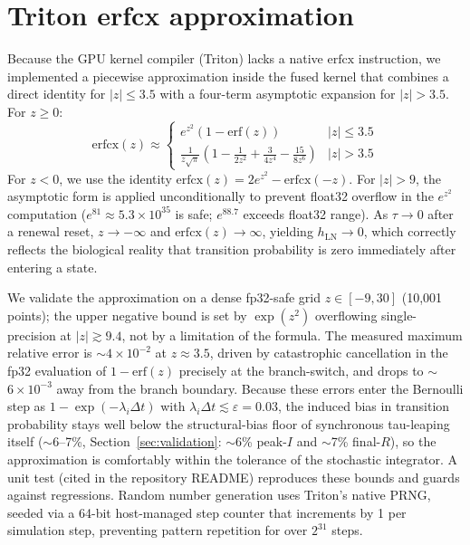 \appendix

\section{Triton erfcx approximation}\label{app:erfcx}

Because the GPU kernel compiler (Triton) lacks a native $\mathrm{erfcx}$ instruction, we implemented a piecewise approximation inside the fused kernel that combines a direct identity for $|z| \leq 3.5$ with a four-term asymptotic expansion for $|z| > 3.5$. For $z \geq 0$:
\begin{equation}
    \mathrm{erfcx}(z) \approx \begin{cases}
        e^{z^2}(1 - \mathrm{erf}(z)) & |z| \leq 3.5 \\[4pt]
        \displaystyle\frac{1}{z\sqrt{\pi}}\left(1 - \frac{1}{2z^2} + \frac{3}{4z^4} - \frac{15}{8z^6}\right) & |z| > 3.5
    \end{cases}
\end{equation}
For $z < 0$, we use the identity $\mathrm{erfcx}(z) = 2e^{z^2} - \mathrm{erfcx}(-z)$. For $|z| > 9$, the asymptotic form is applied unconditionally to prevent float32 overflow in the $e^{z^2}$ computation ($e^{81} \approx 5.3 \times 10^{35}$ is safe; $e^{88.7}$ exceeds float32 range). As $\tau \to 0$ after a renewal reset, $z \to -\infty$ and $\mathrm{erfcx}(z) \to \infty$, yielding $h_{\mathrm{LN}} \to 0$, which correctly reflects the biological reality that transition probability is zero immediately after entering a state.

We validate the approximation on a dense fp32-safe grid $z \in [-9, 30]$ (10{,}001 points); the upper negative bound is set by $\exp(z^2)$ overflowing single-precision at $|z| \gtrsim 9.4$, not by a limitation of the formula. The measured maximum relative error is $\sim$$4 \times 10^{-2}$ at $z \approx 3.5$, driven by catastrophic cancellation in the fp32 evaluation of $1 - \mathrm{erf}(z)$ precisely at the branch-switch, and drops to $\sim$$6 \times 10^{-3}$ away from the branch boundary. Because these errors enter the Bernoulli step as $1 - \exp(-\lambda_i \Delta t)$ with $\lambda_i \Delta t \lesssim \varepsilon = 0.03$, the induced bias in transition probability stays well below the structural-bias floor of synchronous tau-leaping itself ($\sim$6--7\%, Section~\ref{sec:validation}: $\sim$6\% peak-$I$ and $\sim$7\% final-$R$), so the approximation is comfortably within the tolerance of the stochastic integrator. A unit test (cited in the repository README) reproduces these bounds and guards against regressions. Random number generation uses Triton's native PRNG, seeded via a 64-bit host-managed step counter that increments by 1 per simulation step, preventing pattern repetition for over $2^{31}$ steps.

